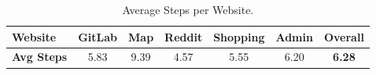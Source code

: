 \begin{table}[t]
  \caption{Average Steps per Website.}
  \vskip 0.1in
  \label{tab:avg_steps_per_site}
  \begin{center}
    \begin{small}
      \begin{tabular}{lcccccc}
        \toprule
        \textbf{Website} 
        & \textbf{GitLab} 
        & \textbf{Map} 
        & \textbf{Reddit} 
        & \textbf{Shopping} 
        & \textbf{Admin}
        & \textbf{Overall} \\
        \midrule
        \textbf{Avg Steps} 
        & 5.83 
        & 9.39 
        & 4.57 
        & 5.55 
        & 6.20
        & \textbf{6.28} \\
        \bottomrule
      \end{tabular}
    \end{small}
  \end{center}
  \vskip -0.1in
\end{table}
